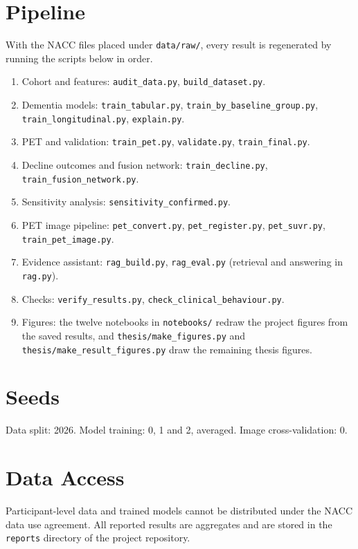 \section{Pipeline}
With the NACC files placed under \texttt{data/raw/}, every result is regenerated by running the scripts below in order.
{\raggedright
\begin{enumerate}[noitemsep]
\item Cohort and features: \texttt{audit\_data.py}, \texttt{build\_dataset.py}.
\item Dementia models: \texttt{train\_tabular.py}, \texttt{train\_by\_baseline\_group.py}, \texttt{train\_longitudinal.py}, \texttt{explain.py}.
\item PET and validation: \texttt{train\_pet.py}, \texttt{validate.py}, \texttt{train\_final.py}.
\item Decline outcomes and fusion network: \texttt{train\_decline.py}, \texttt{train\_fusion\_network.py}.
\item Sensitivity analysis: \texttt{sensitivity\_confirmed.py}.
\item PET image pipeline: \texttt{pet\_convert.py}, \texttt{pet\_register.py}, \texttt{pet\_suvr.py}, \texttt{train\_pet\_image.py}.
\item Evidence assistant: \texttt{rag\_build.py}, \texttt{rag\_eval.py} (retrieval and answering in \texttt{rag.py}).
\item Checks: \texttt{verify\_results.py}, \texttt{check\_clinical\_behaviour.py}.
\item Figures: the twelve notebooks in \texttt{notebooks/} redraw the project figures from the saved results, and \texttt{thesis/make\_figures.py} and \texttt{thesis/make\_result\_figures.py} draw the remaining thesis figures.
\end{enumerate}\par}

\section{Seeds}
Data split: 2026. Model training: 0, 1 and 2, averaged. Image cross-validation: 0.

\section{Data Access}
Participant-level data and trained models cannot be distributed under the NACC data use agreement. All reported results are aggregates and are stored in the \texttt{reports} directory of the project repository.
